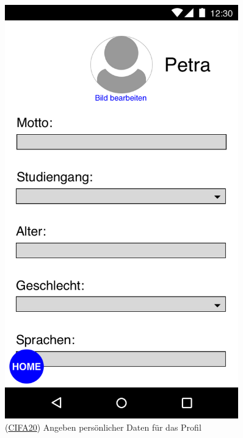 \documentclass[a4paper]{scrreprt}
\begin{document}
\begin{figure}[H]
	\centering
	\begin{minipage}[b]{0.48\textwidth}
		\centering
		\includegraphics[width=0.9\textwidth]{res/GUI/03.jpeg}
		\label{Fig.3}
		(\hyperlink{cifa20}{CIFA20}) Angeben persönlicher Daten für das Profil
	\end{minipage}
	\begin{minipage}[b]{0.48\textwidth}
		\centering

\end{minipage}
\end{figure}
\end{document}
